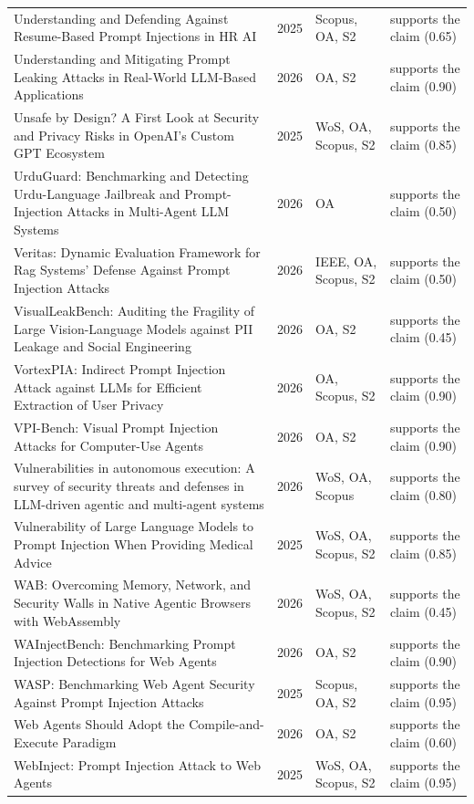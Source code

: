 \begin{longtable}{@{}%
  >{\raggedright\arraybackslash}p{}c%
  >{\raggedright\arraybackslash}p{}%
  >{\raggedright\arraybackslash}p{}@{}}
Understanding and Defending Against Resume-Based Prompt Injections in HR AI & 2025 & Scopus, OA, S2 & supports the claim (0.65) \\
Understanding and Mitigating Prompt Leaking Attacks in Real-World LLM-Based Applications & 2026 & OA, S2 & supports the claim (0.90) \\
Unsafe by Design? A First Look at Security and Privacy Risks in OpenAI's Custom GPT Ecosystem & 2025 & WoS, OA, Scopus, S2 & supports the claim (0.85) \\
UrduGuard: Benchmarking and Detecting Urdu-Language Jailbreak and Prompt-Injection Attacks in Multi-Agent LLM Systems & 2026 & OA & supports the claim (0.50) \\
Veritas: Dynamic Evaluation Framework for Rag Systems' Defense Against Prompt Injection Attacks & 2026 & IEEE, OA, Scopus, S2 & supports the claim (0.50) \\
VisualLeakBench: Auditing the Fragility of Large Vision-Language Models against PII Leakage and Social Engineering & 2026 & OA, S2 & supports the claim (0.45) \\
VortexPIA: Indirect Prompt Injection Attack against LLMs for Efficient Extraction of User Privacy & 2026 & OA, Scopus, S2 & supports the claim (0.90) \\
VPI-Bench: Visual Prompt Injection Attacks for Computer-Use Agents & 2026 & OA, S2 & supports the claim (0.90) \\
Vulnerabilities in autonomous execution: A survey of security threats and defenses in LLM-driven agentic and multi-agent systems & 2026 & WoS, OA, Scopus & supports the claim (0.80) \\
Vulnerability of Large Language Models to Prompt Injection When Providing Medical Advice & 2025 & WoS, OA, Scopus, S2 & supports the claim (0.85) \\
WAB: Overcoming Memory, Network, and Security Walls in Native Agentic Browsers with WebAssembly & 2026 & WoS, OA, Scopus, S2 & supports the claim (0.45) \\
WAInjectBench: Benchmarking Prompt Injection Detections for Web Agents & 2026 & OA, S2 & supports the claim (0.90) \\
WASP: Benchmarking Web Agent Security Against Prompt Injection Attacks & 2025 & Scopus, OA, S2 & supports the claim (0.95) \\
Web Agents Should Adopt the Compile-and-Execute Paradigm & 2026 & OA, S2 & supports the claim (0.60) \\
WebInject: Prompt Injection Attack to Web Agents & 2025 & WoS, OA, Scopus, S2 & supports the claim (0.95) \\

\end{longtable}
